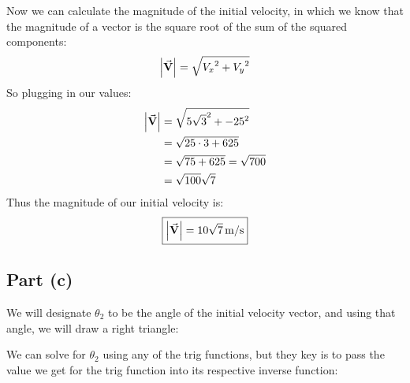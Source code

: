 \documentclass{article}
\begin{document}
Now we can calculate the magnitude of the initial velocity, in which 
we know that the magnitude of a vector is the square root of the 
sum of the squared components:
\[ \abs{\va{V}} = \sqrt{{V_x}^2+{V_y}^2} \]
So plugging in our values:
\begin{align*}
    \abs{\va{V}} &= \sqrt{{5\sqrt3}^2+{-25}^2} \\
                 &= \sqrt{25\cdot3+625} \\
                 &= \sqrt{75+625} = \sqrt{700} \\
                 &= \sqrt{100}\sqrt{7}
\end{align*}
Thus the magnitude of our initial velocity is:
\[ \boxed{\abs{\va{V}} = 10\sqrt{7}\,\mathrm{m/s}} \]

\newpage 
\subsection*{Part (c)}
We will designate $\theta_2$ to be the angle of the initial
velocity vector, and using that angle, we will draw a right 
triangle:
\begin{figure}[H]
    \centering
\end{figure}
We can solve for $\theta_2$ using any of the trig functions, but
they key is to pass the value we get for the trig function into 
its respective inverse function:
\end{document}
